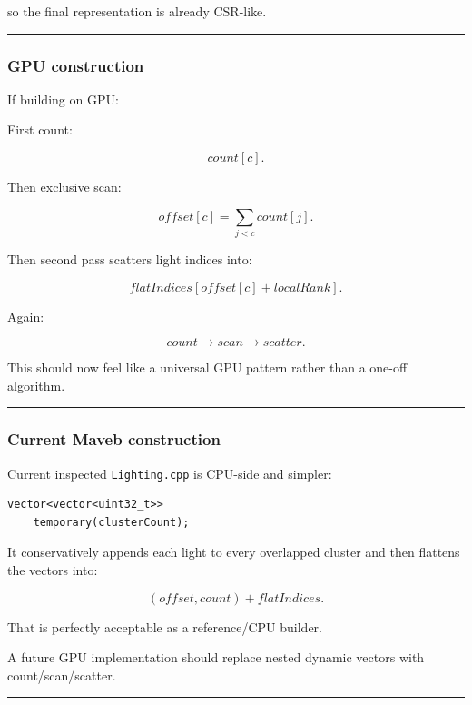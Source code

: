 so the final representation is already CSR-like.

\begin{center}\rule{0.5\linewidth}{0.5pt}\end{center}

\subsubsection{GPU construction}\label{gpu-construction}

If building on GPU:

First count:

\[
count[c].
\]

Then exclusive scan:

\[
offset[c]
=
\sum_{j<c}count[j].
\]

Then second pass scatters light indices into:

\[
flatIndices[
offset[c]+localRank
].
\]

Again:

\[
\boxed{
count
\rightarrow
scan
\rightarrow
scatter.
}
\]

This should now feel like a universal GPU pattern rather than a one-off algorithm.

\begin{center}\rule{0.5\linewidth}{0.5pt}\end{center}

\subsubsection{Current Maveb construction}\label{current-maveb-construction}

Current inspected \texttt{Lighting.cpp} is CPU-side and simpler:

\begin{verbatim}
vector<vector<uint32_t>>
    temporary(clusterCount);
\end{verbatim}

It conservatively appends each light to every overlapped cluster and then flattens the vectors into:

\[
(offset,count)
+
flatIndices.
\]

That is perfectly acceptable as a reference/CPU builder.

A future GPU implementation should replace nested dynamic vectors with count/scan/scatter.

\begin{center}\rule{0.5\linewidth}{0.5pt}\end{center}

